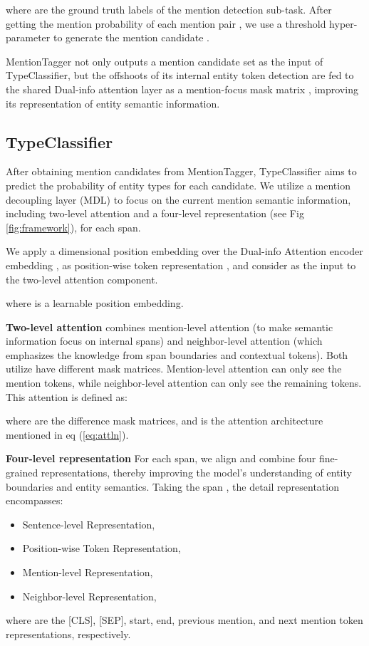 \documentclass[11pt,a4paper]{article}
\begin{document}
where  are the ground truth labels of the mention detection sub-task.
After getting the mention probability  of each mention pair , we use  a threshold hyper-parameter to generate the mention candidate .

MentionTagger not only outputs a mention candidate set  as the input of TypeClassifier, but the offshoots of its internal entity token detection  are fed to the shared Dual-info attention layer as a mention-focus mask matrix , improving its representation of entity semantic information.

\subsection{TypeClassifier}
\label{subsec:TypeClassifier}

After obtaining mention candidates from MentionTagger, TypeClassifier aims to predict the probability of entity types for each candidate.
We utilize a mention decoupling layer (MDL) to focus on the current mention semantic information, including two-level attention and a four-level representation (see Fig \ref{fig:framework}), for each span.

We apply a dimensional position embedding  over the Dual-info Attention encoder embedding , as position-wise token representation , and consider  as the input to the two-level attention component.

where  is a learnable position embedding. 

\textbf{Two-level attention}
combines mention-level attention  (to make semantic information focus on internal spans)
and neighbor-level attention  (which 
emphasizes the knowledge from span boundaries and contextual tokens). 
Both utilize have different mask matrices. Mention-level attention can only see the mention tokens, while neighbor-level attention can only see the remaining tokens.
This attention is defined as:

where  are the difference mask matrices, and  is the attention architecture mentioned in eq (\ref{eq:attln}).

\textbf{Four-level representation}
For each span, we align and combine four fine-grained representations, thereby improving the model's understanding of entity boundaries and entity semantics.
Taking the span , the detail representation encompasses:

\begin{itemize}
\item Sentence-level Representation,

\item Position-wise Token Representation,

\item Mention-level Representation,

\item Neighbor-level Representation,

\end{itemize}
where  are the [CLS], [SEP], start, end, previous mention, and next mention token representations, respectively.
\end{document}
